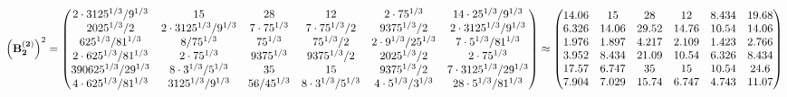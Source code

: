 \documentclass[10pt,a4paper]{article}
\begin{document}
	\[
		\left(\bold{B_2^{(2)}}\right)^{2} = 
		\begin{pmatrix}
			{{2} \cdot {3125^ {1 / 3}}} / {{9^ {1 / 3}}} & {{15}}{} & {{28}}{} & {{12}}{} & {{2} \cdot {75^ {1 / 3}}}{} & {{14} \cdot {25^ {1 / 3}}} / {{9^ {1 / 3}}} \\
			{{2025^ {1 / 3}}} / {{2}} & {{2} \cdot {3125^ {1 / 3}}} / {{9^ {1 / 3}}} & {{7} \cdot {75^ {1 / 3}}}{} & {{7} \cdot {75^ {1 / 3}}} / {{2}} & {{9375^ {1 / 3}}} / {{2}} & {{2} \cdot {3125^ {1 / 3}}} / {{9^ {1 / 3}}} \\
			{{625^ {1 / 3}}} / {{81^ {1 / 3}}} & {{8}} / {{75^ {1 / 3}}} & {{75^ {1 / 3}}}{} & {{75^ {1 / 3}}} / {{2}} & {{2} \cdot {9^ {1 / 3}}} / {{25^ {1 / 3}}} & {{7} \cdot {5^ {1 / 3}}} / {{81^ {1 / 3}}} \\
			{{2} \cdot {625^ {1 / 3}}} / {{81^ {1 / 3}}} & {{2} \cdot {75^ {1 / 3}}}{} & {{9375^ {1 / 3}}}{} & {{9375^ {1 / 3}}} / {{2}} & {{2025^ {1 / 3}}} / {{2}} & {{2} \cdot {75^ {1 / 3}}}{} \\
			{{390625^ {1 / 3}}} / {{2}{9^ {1 / 3}}} & {{8} \cdot {3^ {1 / 3}}} / {{5^ {1 / 3}}} & {{35}}{} & {{15}}{} & {{9375^ {1 / 3}}} / {{2}} & {{7} \cdot {3125^ {1 / 3}}} / {{2}{9^ {1 / 3}}} \\
			{{4} \cdot {625^ {1 / 3}}} / {{81^ {1 / 3}}} & {{3125^ {1 / 3}}} / {{9^ {1 / 3}}} & {{56}} / {{45^ {1 / 3}}} & {{8} \cdot {3^ {1 / 3}}} / {{5^ {1 / 3}}} & {{4} \cdot {5^ {1 / 3}}} / {{3^ {1 / 3}}} & {{28} \cdot {5^ {1 / 3}}} / {{81^ {1 / 3}}} \\
		\end{pmatrix}
		\approx
		\begin{pmatrix}
			14.06    & 15       & 28       & 12       & 8.434    & 19.68    \\
			6.326    & 14.06    & 29.52    & 14.76    & 10.54    & 14.06    \\
			1.976    & 1.897    & 4.217    & 2.109    & 1.423    & 2.766    \\
			3.952    & 8.434    & 21.09    & 10.54    & 6.326    & 8.434    \\
			17.57    & 6.747    & 35       & 15       & 10.54    & 24.6     \\
			7.904    & 7.029    & 15.74    & 6.747    & 4.743    & 11.07    \\
		\end{pmatrix}
	\]
\end{document}
